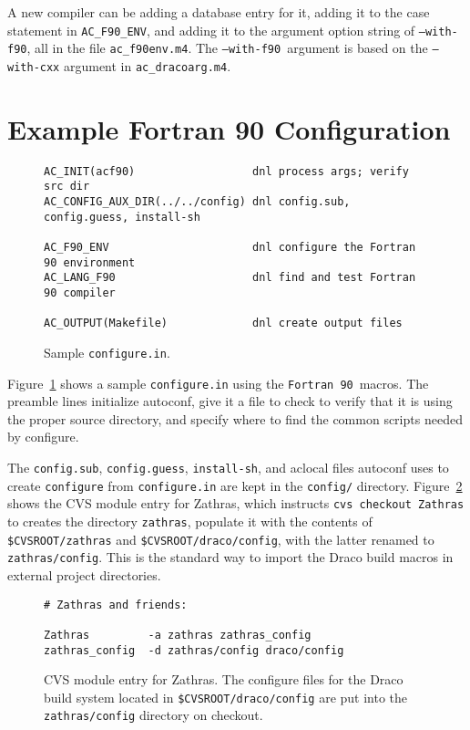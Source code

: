 \documentclass[11pt]{nmemo}
\newcommand{\fninety}{\texttt{Fortran~90}}
\newcommand{\withfninety}{\texttt{--with-f90}}
\newcommand{\fninetyenv}{\texttt{AC\_F90\_ENV}}
\begin{document}
A new compiler can be adding a database entry for it, adding it to the
case statement in \fninetyenv, and adding it to the argument option
string of \withfninety, all in the file \texttt{ac\_f90env.m4}. The
\withfninety\ argument is based on the \texttt{--with-cxx} argument in
\texttt{ac\_dracoarg.m4}.

\section{Example Fortran 90 Configuration}

\begin{figure}[hbt]
\hrulefill
\begin{verbatim}
AC_INIT(acf90)                  dnl process args; verify src dir
AC_CONFIG_AUX_DIR(../../config) dnl config.sub, config.guess, install-sh

AC_F90_ENV                      dnl configure the Fortran 90 environment
AC_LANG_F90                     dnl find and test Fortran 90 compiler 

AC_OUTPUT(Makefile)             dnl create output files
\end{verbatim}
\caption{Sample \texttt{configure.in}.}\label{fig:configure}
\hrulefill
\end{figure}

Figure~\ref{fig:configure} shows a sample \texttt{configure.in} using
the \fninety\ macros.  The preamble lines initialize autoconf, give it
a file to check to verify that it is using the proper source
directory, and specify where to find the common scripts needed by
configure.  

The \texttt{config.sub}, \texttt{config.guess}, \texttt{install-sh},
and aclocal files autoconf uses to create \texttt{configure} from
\texttt{configure.in} are kept in the \texttt{config/} directory.
Figure~\ref{fig:zathras} shows the CVS module entry for Zathras, which
instructs \texttt{cvs~checkout~Zathras} to creates the directory
\texttt{zathras}, populate it with the contents of
\texttt{\$CVSROOT/zathras} and \texttt{\$CVSROOT/draco/config}, with
the latter renamed to \texttt{zathras/config}.  This is the standard
way to import the Draco build macros in external project directories.
\begin{figure}[hbt]
\hrulefill
\begin{verbatim}
# Zathras and friends:

Zathras         -a zathras zathras_config
zathras_config  -d zathras/config draco/config
\end{verbatim}
\caption{CVS module entry for Zathras.  The configure files for the
Draco build system located in \texttt{\$CVSROOT/draco/config} are put
into the \texttt{zathras/config} directory on
checkout.}\label{fig:zathras}
\hrulefill
\end{figure}
\end{document}
